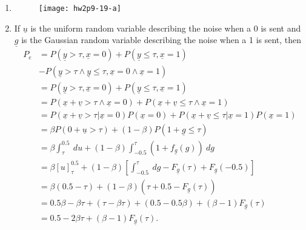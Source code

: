 \documentclass{article}
\begin{document}
\begin{enumerate}[label=(\roman*)]
  \item{\begin{figure}
        \centering\texttt{[image: hw2p9-19-a]}
        \end{figure}}
  \item{
       If $\underline{u}$ is the uniform random variable describing
       the noise when a 0 is sent and $\underline{g}$ is the Gaussian
       random variable describing the noise when a 1 is sent, then
       \begin{align*}
       P_e &= P(\underline{y} >    \tau, \underline{x} = 0)
           + P(\underline{y} \leq \tau, \underline{x} = 1) \\
           &- P(\underline{y} > \tau \wedge \underline{y} \leq \tau,
                \underline{x} = 0 \wedge \underline{x} = 1) \\
           &= P(\underline{y} >    \tau, \underline{x} = 0)
           + P(\underline{y} \leq \tau, \underline{x} = 1) \\
           &= P(\underline{x} + \underline{v} > \tau \wedge
                \underline{x} = 0)
            + P(\underline{x} + \underline{v} \leq \tau \wedge
                \underline{x} = 1) \\
           &= P(\underline{x} + \underline{v} > \tau 
                | \underline{x} = 0)P(\underline{x} = 0)
            + P(\underline{x} + \underline{v} \leq \tau
                | \underline{x} = 1)P(\underline{x} = 1) \\
           &= \beta P(0 + \underline{u} > \tau) 
            + (1 - \beta)P(1 + \underline{g} \leq \tau) \\
           &= \beta \int_{\tau}^{0.5} ~du 
            + (1 - \beta)\int_{-0.5}^\tau (1 + f_{\underline{g}}(g)) ~dg\\
           &= \beta \left[u\right]_{\tau}^{0.5}
            + (1 - \beta)\left[\int_{-0.5}^\tau ~dg 
               - F_{\underline{g}}(\tau) 
               + F_{\underline{g}}(-0.5)\right] \\
           &= \beta(0.5 - \tau) + (1-\beta)(\tau + 0.5 
                                           - F_{\underline{g}}(\tau)) \\
           &= 0.5\beta - \beta\tau + (\tau - \beta\tau) + (0.5 - 0.5\beta)
            + (\beta - 1) F_{\underline{g}}(\tau) \\
           &= 0.5 - 2\beta\tau + (\beta - 1)F_{\underline{g}}(\tau).
       \end{align*}
}
\end{enumerate}
\end{document}
